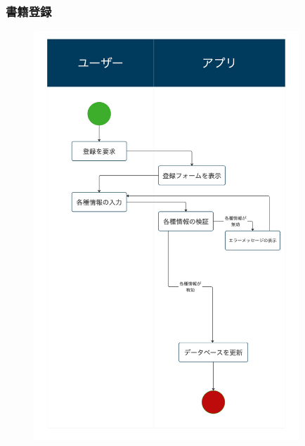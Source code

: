 \documentclass[a4paper, 11pt, titlepage]{jsarticle}
\begin{document}
\subsubsection{書籍登録}
\begin{figure}[h]
\centering
\includegraphics[width=100mm]{flow-touroku.jpg}
\label{fig:func}
\end{figure}

\clearpage
\end{document}

